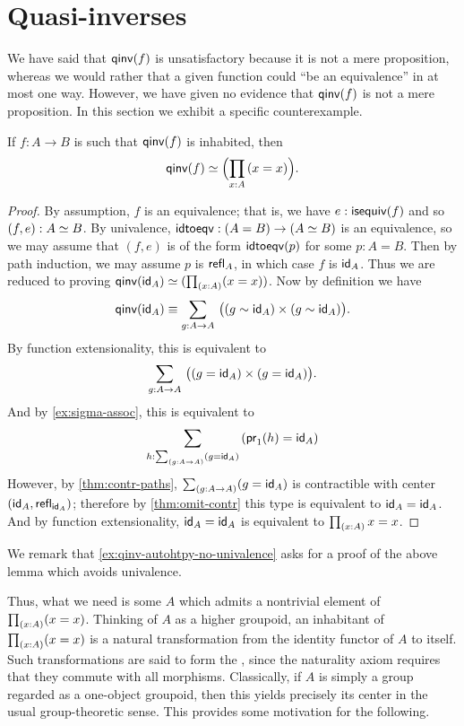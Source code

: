 \section{Quasi-inverses}
\label{sec:quasi-inverses}

%
We have said that $\qinv(f)$ is unsatisfactory because it is not a mere proposition, whereas we would rather that a given function could ``be an equivalence'' in at most one way.
However, we have given no evidence that $\qinv(f)$ is not a mere proposition.
In this section we exhibit a specific counterexample.

\begin{lem}\label{lem:qinv-autohtpy}
  If $f:A\to B$ is such that $\qinv (f)$ is inhabited, then
  \[\eqv{\qinv(f)}{\Parens{\prd{x:A}(x=x)}}.\]
\end{lem}
\begin{proof}
  By assumption, $f$ is an equivalence; that is, we have $e:\isequiv(f)$ and so $(f,e):\eqv A B$.
  By univalence, $\idtoeqv:(A=B) \to (\eqv A B)$ is an equivalence, so we may assume that $(f,e)$ is of the form $\idtoeqv(p)$ for some $p:A=B$.
  Then by path induction, we may assume $p$ is $\refl{A}$, in which case $f$ is $\idfunc[A]$.
  Thus we are reduced to proving $\eqv{\qinv(\idfunc[A])}{(\prd{x:A}(x=x))}$.
  Now by definition we have
  \[ \qinv(\idfunc[A]) \jdeq
  \sm{g:A\to A} \big((g \htpy \idfunc[A]) \times (g \htpy \idfunc[A])\big).
  \]
  By function extensionality, this is equivalent to
  \[ \sm{g:A\to A} \big((g = \idfunc[A]) \times (g = \idfunc[A])\big).
  \]
  And by \cref{ex:sigma-assoc}, this is equivalent to
  \[ \sm{h:\sm{g:A\to A} (g = \idfunc[A])} (\proj1(h) = \idfunc[A])
  \]
  However, by \cref{thm:contr-paths}, $\sm{g:A\to A} (g = \idfunc[A])$ is contractible with center $(\idfunc[A],\refl{\idfunc[A]})$; therefore by \cref{thm:omit-contr} this type is equivalent to $\idfunc[A] = \idfunc[A]$.
  And by function extensionality, $\idfunc[A] = \idfunc[A]$ is equivalent to $\prd{x:A} x=x$.
\end{proof}

\noindent
We remark that \cref{ex:qinv-autohtpy-no-univalence} asks for a proof of the above lemma which avoids univalence.

Thus, what we need is some $A$ which admits a nontrivial element of $\prd{x:A}(x=x)$.
Thinking of $A$ as a higher groupoid, an inhabitant of $\prd{x:A}(x=x)$ is a natural transformation from the identity functor of $A$ to itself.
Such transformations are said to form the ,
%
%
since the naturality axiom requires that they commute with all morphisms.
Classically, if $A$ is simply a group regarded as a one-object groupoid, then this yields precisely its center in the usual group-theoretic sense.
This provides some motivation for the following.

